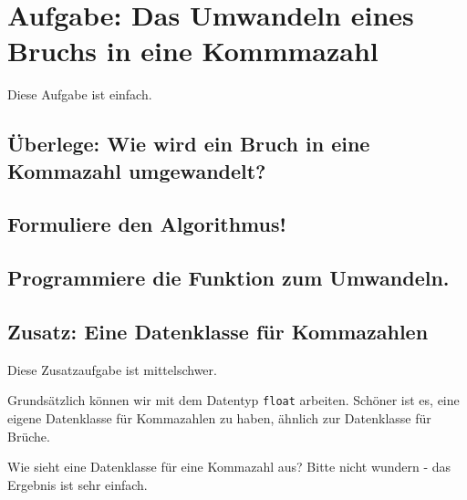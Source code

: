 \section{Aufgabe: Das Umwandeln eines Bruchs in eine Kommmazahl}

Diese Aufgabe ist einfach.

\subsection{Überlege: Wie wird ein Bruch in eine Kommazahl umgewandelt?}

\subsection{Formuliere den Algorithmus!}

\subsection{Programmiere die Funktion zum Umwandeln.}

\subsection{Zusatz: Eine Datenklasse für Kommazahlen}

Diese Zusatzaufgabe ist mittelschwer.

Grundsätzlich können wir mit dem Datentyp \texttt{float} arbeiten. Schöner ist es, eine eigene Datenklasse für Kommazahlen zu haben, ähnlich zur Datenklasse für Brüche.

Wie sieht eine Datenklasse für eine Kommazahl aus? Bitte nicht wundern - das Ergebnis ist sehr einfach.